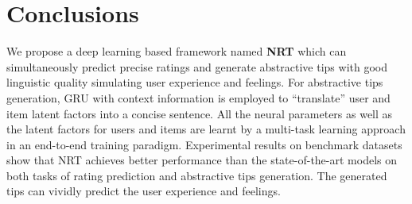 \documentclass[sigconf]{acmart}
\begin{document}
\begin{comment}
\hline
\textbf{\textit{4.60}} &\textbf{\textit{I am not a big fan of the Coen brothers but this movie was great.}} \\
5 & Gritty rough powerhouse of a drama well made and beautifully acted. \\
\end{comment}







\section{Conclusions}

We propose a deep learning based framework named \textbf{NRT} which can simultaneously predict precise ratings and generate abstractive tips with good linguistic quality simulating user experience and feelings.
For abstractive tips generation, GRU with context information is employed to ``translate'' user and item latent factors into a concise sentence.
All the neural parameters as well as the latent factors for users and items are learnt by a multi-task learning approach in an end-to-end training paradigm.
Experimental results on benchmark datasets show that NRT achieves better performance than the state-of-the-art models on both tasks of rating prediction and abstractive tips generation.
The generated tips can vividly predict the user experience and feelings. 





\end{document}
